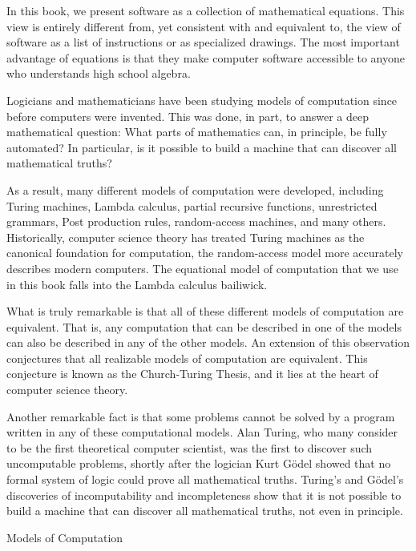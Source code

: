 In this book, we present software as a collection of mathematical
equations.  This view is entirely different from, yet consistent with
and equivalent to, the view of
software as a list of instructions or as specialized drawings.
The most important advantage of equations is that they make computer software accessible to anyone who understands high school algebra.

\begin{aside}
Logicians and mathematicians have been studying models of computation
since before computers were invented. This was done, in part, to
answer a deep mathematical question: What parts of mathematics can,
in principle, be fully automated?  In particular, is it possible to
build a machine that can discover all mathematical truths?

As a result, many different models of computation were developed,
including Turing machines, Lambda calculus, partial recursive
functions, unrestricted grammars, Post production rules, random-access
machines, and many others.  Historically, computer science theory has
treated Turing machines as the canonical foundation for computation,
the random-access model more accurately describes modern computers.
The equational model of computation that we use in this book falls
into the Lambda calculus bailiwick.

What is truly remarkable is that all of these different models of
computation are equivalent.  That is,
any computation that can be described in one of the models can also
be described in any of the other models.  An extension of this observation
conjectures that all realizable models
of computation are equivalent.  This conjecture is known as the
Church-Turing Thesis, and it lies at the heart of computer science
theory.

Another remarkable fact is that some problems cannot be solved by a program
written in any of these computational models. Alan
Turing, who many consider to be the first theoretical computer
scientist, was the first to discover such uncomputable problems,
shortly after the logician Kurt G\"odel showed that no formal system
of logic could prove all mathematical truths.  Turing's and G\"odel's
discoveries of incomputability and incompleteness show that it is
not possible to build a machine that can discover all mathematical
truths, not even in principle.

\caption{Models of Computation}
\label{aside-model-of-computation}
\end{aside}

